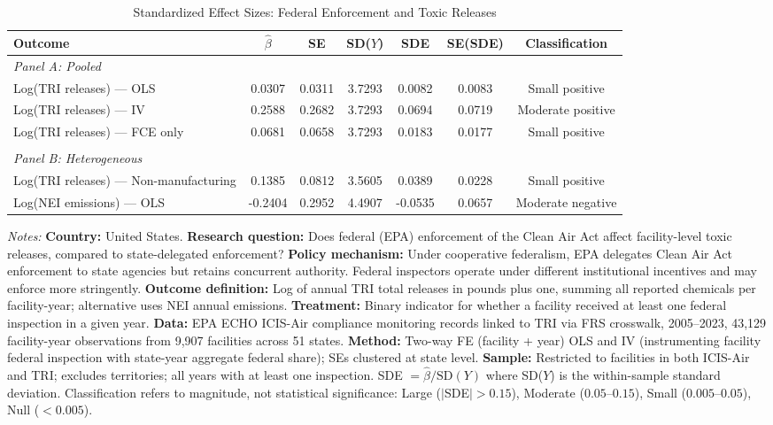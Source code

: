 \begin{table}[htbp]
\centering
\caption{Standardized Effect Sizes: Federal Enforcement and Toxic Releases}
\label{tab:sde}
\begin{threeparttable}
\begin{adjustbox}{max width=\textwidth}
\begin{tabular}{lcccccc}
\toprule
Outcome & $\hat{\beta}$ & SE & SD($Y$) & SDE & SE(SDE) & Classification \\
\midrule
\multicolumn{7}{l}{\textit{Panel A: Pooled}} \\[3pt]
Log(TRI releases) --- OLS & 0.0307 & 0.0311 & 3.7293 & 0.0082 & 0.0083 & Small positive \\
Log(TRI releases) --- IV & 0.2588 & 0.2682 & 3.7293 & 0.0694 & 0.0719 & Moderate positive \\
Log(TRI releases) --- FCE only & 0.0681 & 0.0658 & 3.7293 & 0.0183 & 0.0177 & Small positive \\
\\[6pt]
\multicolumn{7}{l}{\textit{Panel B: Heterogeneous}} \\[3pt]
Log(TRI releases) --- Non-manufacturing & 0.1385 & 0.0812 & 3.5605 & 0.0389 & 0.0228 & Small positive \\
Log(NEI emissions) --- OLS & -0.2404 & 0.2952 & 4.4907 & -0.0535 & 0.0657 & Moderate negative \\
\bottomrule
\end{tabular}
\end{adjustbox}
\end{threeparttable}
\par\vspace{0.3em}
\begin{minipage}{\textwidth}
\footnotesize \textit{Notes:}
\textbf{Country:} United States.
\textbf{Research question:} Does federal (EPA) enforcement of the Clean Air Act affect facility-level toxic releases, compared to state-delegated enforcement?
\textbf{Policy mechanism:} Under cooperative federalism, EPA delegates Clean Air Act enforcement to state agencies but retains concurrent authority. Federal inspectors operate under different institutional incentives and may enforce more stringently.
\textbf{Outcome definition:} Log of annual TRI total releases in pounds plus one, summing all reported chemicals per facility-year; alternative uses NEI annual emissions.
\textbf{Treatment:} Binary indicator for whether a facility received at least one federal inspection in a given year.
\textbf{Data:} EPA ECHO ICIS-Air compliance monitoring records linked to TRI via FRS crosswalk, 2005--2023, 43,129 facility-year observations from 9,907 facilities across 51 states.
\textbf{Method:} Two-way FE (facility + year) OLS and IV (instrumenting facility federal inspection with state-year aggregate federal share); SEs clustered at state level.
\textbf{Sample:} Restricted to facilities in both ICIS-Air and TRI; excludes territories; all years with at least one inspection.
SDE $= \hat{\beta} / \text{SD}(Y)$ where SD($Y$) is the within-sample standard deviation.
Classification refers to magnitude, not statistical significance: Large ($|$SDE$| > 0.15$), Moderate ($0.05$--$0.15$), Small ($0.005$--$0.05$), Null ($< 0.005$).
\end{minipage}
\end{table}
